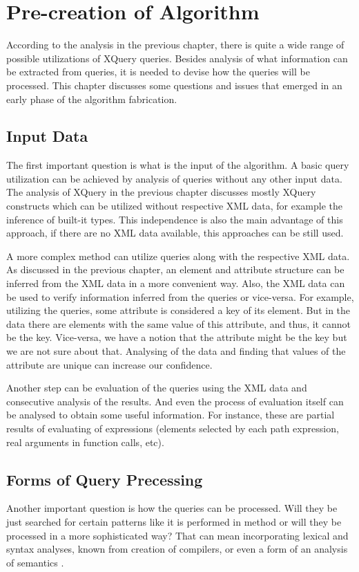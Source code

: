 \chapter{Pre-creation of Algorithm}
According to the analysis in the previous chapter, there is quite a wide range of possible utilizations of XQuery queries. Besides analysis of what information can be extracted from queries, it is needed to devise how the queries will be processed. This chapter discusses some questions and issues that emerged in an early phase of the algorithm fabrication.

\section{Input Data}
The first important question is what is the input of the algorithm. A basic query utilization can be achieved by analysis of queries without any other input data. The analysis of XQuery in the previous chapter discusses mostly XQuery constructs which can be utilized without respective XML data, for example the inference of built-it types. This independence is also the main advantage of this approach, if there are no XML data available, this approaches can be still used. 

A more complex method can utilize queries along with the respective XML data. As discussed in the previous chapter, an element and attribute structure can be inferred from the XML data in a more convenient way. Also, the XML data can be used to verify information inferred from the queries or vice-versa. For example, utilizing the queries, some attribute is considered a key of its element. But in the data there are elements with the same value of this attribute, and thus, it cannot be the key. Vice-versa, we have a notion that the attribute might be the key but we are not sure about that. Analysing of the data and finding that values of the attribute are unique can increase our confidence. 

Another step can be evaluation of the queries using the XML data and consecutive analysis of the results. And even the process of evaluation itself can be analysed to obtain some useful information. For instance, these are partial results of evaluating of expressions (elements selected by each path expression, real arguments in function calls, etc).

\section{Forms of Query Precessing}
Another important question is how the queries can be processed. Will they be just searched for certain patterns like it is performed in method \cite{Necasky:2009:DXK:1529282.1529414} or will they be processed in a more sophisticated way? That can mean incorporating lexical and syntax analyses, known from creation of compilers, or even a form of an analysis of semantics \cite{compilers}.

